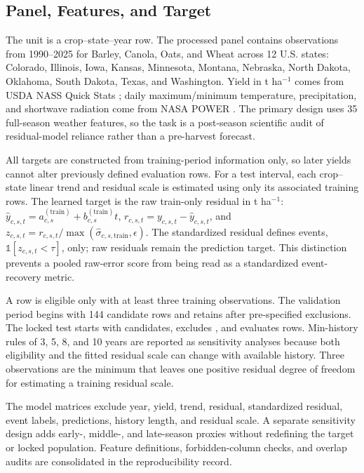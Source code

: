 \documentclass[conference]{IEEEtran}
\begin{document}
\subsection{Panel, Features, and Target}
The unit is a crop--state--year row. The processed panel contains \AuditTotalRows{}
observations from 1990--2025 for Barley, Canola, Oats, and Wheat across 12 U.S.
states: Colorado, Illinois, Iowa, Kansas, Minnesota, Montana, Nebraska, North
Dakota, Oklahoma, South Dakota, Texas, and Washington. Yield in t ha$^{-1}$ comes
from USDA NASS Quick Stats \cite{USDANASSQuickStats}; daily maximum/minimum
temperature, precipitation, and shortwave radiation come from NASA POWER
\cite{NASAPOWER2026}. The primary design uses 35 full-season weather features, so
the task is a post-season scientific audit of residual-model reliance rather than
a pre-harvest forecast.

All targets are constructed from training-period information only, so later yields
cannot alter previously defined evaluation rows. For a test interval, each
crop--state linear trend and residual scale is estimated using only its associated
training rows. The learned target is the raw train-only residual in t ha$^{-1}$:
$\hat{y}_{c,s,t}=a^{(\mathrm{train})}_{c,s}+b^{(\mathrm{train})}_{c,s}t$,
$r_{c,s,t}=y_{c,s,t}-\hat{y}_{c,s,t}$, and
$z_{c,s,t}=r_{c,s,t}/\max(\hat{\sigma}_{c,s,\mathrm{train}},\epsilon)$.
The standardized residual defines events, $\mathbb{1}[z_{c,s,t}<\tau]$, only; raw
residuals remain the prediction target. This distinction prevents a pooled
raw-error score from being read as a standardized event-recovery metric.

A row is eligible only with at least three training observations. The validation
period begins with 144 candidate rows and retains \AuditValidationRows{} after
\AuditValidationExcluded{} pre-specified exclusions. The locked test starts with
\AuditTestCandidateRows{} candidates, excludes \AuditTestExcluded{}, and evaluates
\AuditTestRows{} rows. Min-history rules of 3, 5, 8, and 10 years are reported as
sensitivity analyses because both eligibility and the fitted residual scale can
change with available history. Three observations are the minimum that leaves one
positive residual degree of freedom for estimating a training residual scale.

The model matrices exclude year, yield, trend, residual, standardized residual,
event labels, predictions, history length, and residual scale. A separate
sensitivity design adds early-, middle-, and late-season proxies without
redefining the target or locked population. Feature definitions, forbidden-column
checks, and overlap audits are consolidated in the reproducibility record.
\end{document}
